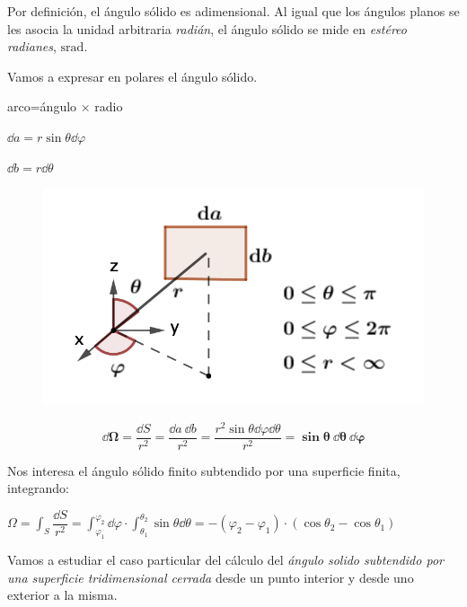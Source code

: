 Por definición, el ángulo sólido es adimensional. Al igual que los ángulos planos se les asocia la unidad arbitraria \emph{radián}, el ángulo sólido se mide en \emph{estéreo radianes}, $\mathrm{srad }$.


\begin{multicols}{2}
Vamos a expresar en polares el ángulo sólido.

arco=ángulo $\times$ radio

$\dd a = r \sin \theta \dd \varphi$

$\dd b= r \dd \theta$
\begin{figure}[H]
	\centering
	\includegraphics[width=.5\textwidth]{imagenes/imagenes23/T23IM04.png}
\end{figure}	
\end{multicols}

$$\boldsymbol{\dd \Omega=} \dfrac{\dd S}{r^2}=\dfrac{\dd a \ \dd b}{r^2}= \dfrac {r^2 \sin \theta \dd \varphi \dd \theta}{r^2} \boldsymbol{=\sin \theta \  \dd \theta \ \dd \varphi}$$

Nos interesa el ángulo sólido finito subtendido por una superficie finita, integrando:

$\Omega= \displaystyle \int_S \dfrac{\dd S}{r^2}=\int_{\varphi_1}^{\varphi_2} \dd \varphi \cdot \int_{\theta_1}^{\theta_2} \sin \theta \dd \theta = -(\varphi_2-\varphi_1)\cdot (\cos \theta_2-\cos \theta_1)$

Vamos a estudiar el caso particular del cálculo del \emph{ángulo solido subtendido por una superficie tridimensional cerrada} desde un punto interior y desde uno exterior a la misma.

